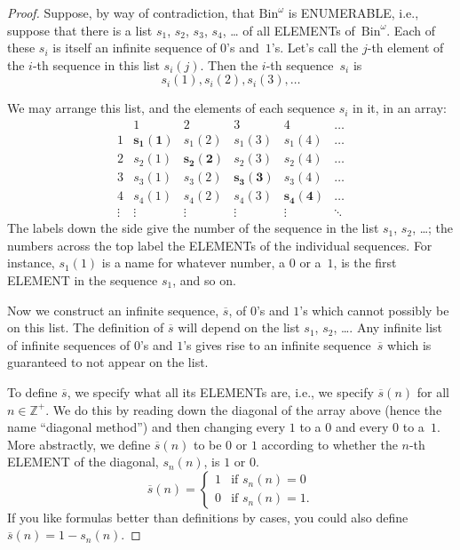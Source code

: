 \documentclass[10pt,a4paper]{article}
\newcommand*{\olup}[1]{\MakeUppercase{#1}}
\theoremstyle{plain}
\theoremstyle{definition}
\theoremstyle{remark}
\providecommand{\PosInt}{\mathbb{Z}^{+}}
\providecommand{\Bin}{\mathrm{Bin}}
\begin{document}
\begin{proof}
Suppose, by way of contradiction, that $\Bin^\omega$ is
\olup{enumerable}, i.e., suppose that there is a list $s_{1}$, $s_{2}$,
$s_{3}$, $s_{4}$, \dots{} of all \olup{element}s of~$\Bin^\omega$.  Each
of these $s_i$ is itself an infinite sequence of $0$'s and~$1$'s.
Let's call the $j$-th element of the $i$-th sequence in this list
$s_i(j)$. Then the $i$-th sequence~$s_i$ is
\[
s_i(1), s_i(2), s_i(3), \dots
\]

We may arrange this list, and the elements of each sequence $s_i$ in
it, in an array:
\[
\begin{array}{c|c|c|c|c|c}
& 1 & 2 & 3 & 4 & \dots \\\hline
1 & \mathbf{s_{1}(1)} & s_{1}(2) & s_{1}(3) & s_1(4) & \dots \\\hline
2 & s_{2}(1)& \mathbf{s_{2}(2)} & s_2(3) & s_2(4) & \dots \\\hline
3 & s_{3}(1)& s_{3}(2) & \mathbf{s_3(3)} & s_3(4) & \dots \\\hline
4 & s_{4}(1)& s_{4}(2) & s_4(3) & \mathbf{s_4(4)} & \dots \\\hline
\vdots & \vdots & \vdots & \vdots & \vdots & \mathbf{\ddots}
\end{array}
\]
The labels down the side give the number of the sequence in the list
$s_1$, $s_2$, \dots; the numbers across the top label the \olup{element}s
of the individual sequences. For instance, $s_{1}(1)$ is a name for
whatever number, a $0$ or a~$1$, is the first \olup{element} in the
sequence $s_{1}$, and so on.

Now we construct an infinite sequence, $\overline{s}$, of $0$'s and
$1$'s which cannot possibly be on this list.  The definition of
$\overline{s}$ will depend on the list $s_1$, $s_2$, \dots.  Any
infinite list of infinite sequences of $0$'s and $1$'s gives rise to
an infinite sequence~$\overline{s}$ which is guaranteed to not appear
on the list.

To define $\overline{s}$, we specify what all its \olup{element}s are,
i.e., we specify $\overline{s}(n)$ for all $n \in \PosInt$.  We do this
by reading down the diagonal of the array above (hence the name
``diagonal method'') and then changing every $1$ to a $0$ and every
$0$ to a~$1$. More abstractly, we define $\overline{s}(n)$ to be $0$
or $1$ according to whether the $n$-th \olup{element} of the diagonal,
$s_n(n)$, is $1$ or $0$.
\[
\overline{s}(n) =
\begin{cases}
1 & \text{if $s_{n}(n) = 0$}\\
0 & \text{if $s_{n}(n) = 1$}.
\end{cases}
\]
If you like formulas better than definitions by cases, you could also
define $\overline{s}(n) = 1 - s_n(n)$.


\end{proof}
\end{document}

